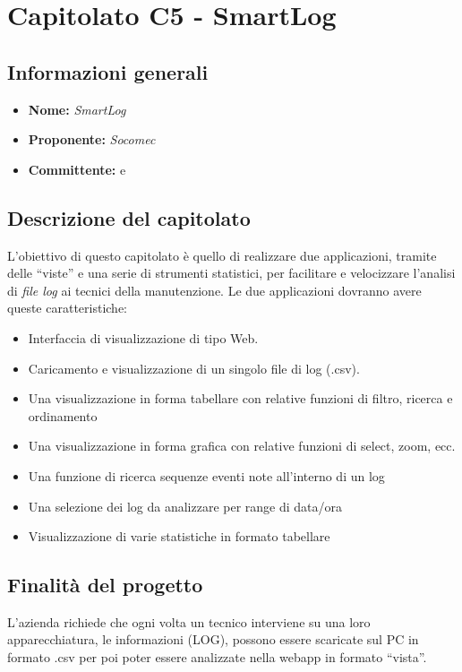 \section{Capitolato C5 - SmartLog}\label{section:c5}

\subsection{Informazioni generali}
\begin{itemize}
    \item \textbf{Nome:} \textit{SmartLog}
    \item \textbf{Proponente:} \textit{Socomec}
    \item \textbf{Committente:} \commitNameM{} e \commitNameS{}
\end{itemize}

\subsection{Descrizione del capitolato}
L’obiettivo di questo capitolato è quello di realizzare due applicazioni, tramite delle “viste” e una serie
di strumenti statistici, per facilitare e velocizzare l'analisi di \textit{file log} ai tecnici della manutenzione.\newline
Le due applicazioni dovranno avere queste caratteristiche:
\begin{itemize}
    \item Interfaccia di visualizzazione di tipo Web.
    \item Caricamento e visualizzazione di un singolo file di log (.csv).
    \item Una visualizzazione in forma tabellare con relative funzioni di filtro, ricerca e ordinamento
    \item Una visualizzazione in forma grafica con relative funzioni di select, zoom, ecc.
    \item Una funzione di ricerca sequenze eventi note all’interno di un log
    \item Una selezione dei log da analizzare per range di data/ora
    \item Visualizzazione di varie statistiche in formato tabellare
\end{itemize}

\subsection{Finalità del progetto}
L’azienda richiede che ogni volta un tecnico interviene su una loro apparecchiatura, le informazioni (LOG), possono essere scaricate sul PC in formato .csv per poi poter essere analizzate nella webapp in formato “vista”.

